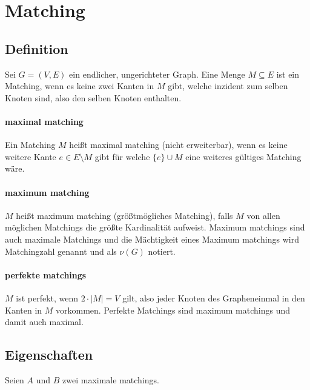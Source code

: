 \documentclass[paper=a4,10pt]{scrartcl}
\begin{document}
\section{Matching}
\subsection{Definition}
Sei $G=(V,E)$ ein endlicher, ungerichteter Graph. Eine Menge $M\subseteq E$ ist ein Matching, wenn es keine zwei Kanten in $M$ gibt, welche inzident zum selben Knoten sind, also den selben Knoten enthalten.

\paragraph{maximal matching}
Ein Matching $M$ heißt maximal matching (nicht erweiterbar), wenn es keine weitere Kante $e \in E \setminus M$ gibt für welche $\{ e\} \cup M$ eine weiteres gültiges Matching wäre.

\paragraph{maximum matching}
$M$ heißt maximum matching (größtmögliches Matching), falls $M$ von allen möglichen Matchings die größte Kardinalität aufweist. Maximum matchings sind auch maximale Matchings und die Mächtigkeit eines Maximum matchings wird Matchingzahl genannt und als $\nu(G)$ notiert.

\paragraph{perfekte matchings}
$M$ ist perfekt, wenn $2 \cdot |M| = V$ gilt, also jeder Knoten des Grapheneinmal in den Kanten in $M$ vorkommen. Perfekte Matchings sind maximum matchings und damit auch maximal. 

\subsection{Eigenschaften}
Seien $A$ und $B$ zwei maximale matchings. 
\end{document}
